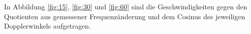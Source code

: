In Abbildung \ref{fig:15}, \ref{fig:30} und \ref{fig:60} sind die Geschwindigkeiten gegen den Quotienten aus gemessener Frequenzänderung und dem Cosinus des jeweiligen
Dopplerwinkels aufgetragen.


